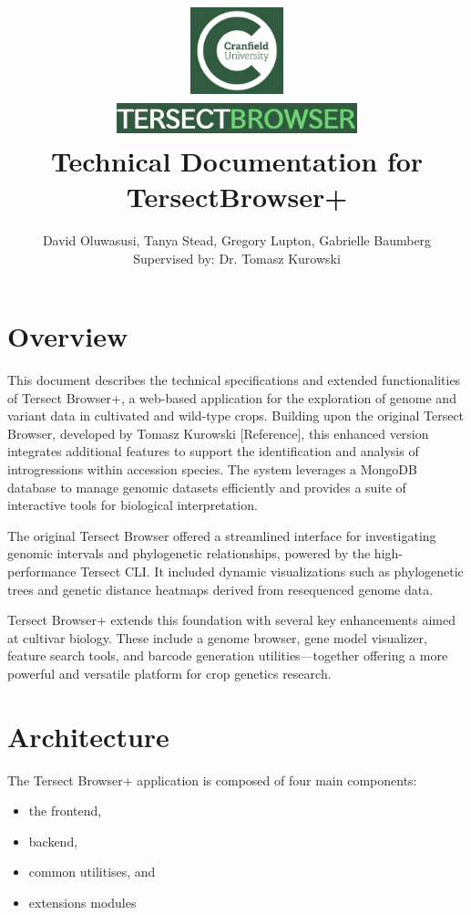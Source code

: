 \documentclass[12pt]{article}
\title{
{\includegraphics[width=3cm, height=2.5cm]{Cran.jpg}}
\\
\includegraphics[width=7cm, height=1cm]{TB.jpg}
\\
{Technical Documentation for TersectBrowser+}
}
\author{David Oluwasusi, Tanya Stead, Gregory Lupton, Gabrielle Baumberg \\ Supervised by: Dr. Tomasz Kurowski}
\begin{document}
\sloppy %

\maketitle

\section{Overview}
This document describes the technical specifications and extended functionalities of Tersect Browser+, a web-based application for the exploration of genome and variant data in cultivated and wild-type crops. Building upon the original Tersect Browser, developed by Tomasz Kurowski [Reference], this enhanced version integrates additional features to support the identification and analysis of introgressions within accession species. The system leverages a MongoDB database to manage genomic datasets efficiently and provides a suite of interactive tools for biological interpretation.


The original Tersect Browser offered a streamlined interface for investigating genomic intervals and phylogenetic relationships, powered by the high-performance Tersect CLI. It included dynamic visualizations such as phylogenetic trees and genetic distance heatmaps derived from resequenced genome data.

Tersect Browser+ extends this foundation with several key enhancements aimed at cultivar biology. These include a genome browser, gene model visualizer, feature search tools, and barcode generation utilities—together offering a more powerful and versatile platform for crop genetics research.


\section{Architecture}
The Tersect Browser+ application is composed of four main components: 
\begin{itemize}
    \item the frontend, 
    \item backend, 
    \item common utilitises, and
    \item extensions modules
\end{itemize}
\end{document}
